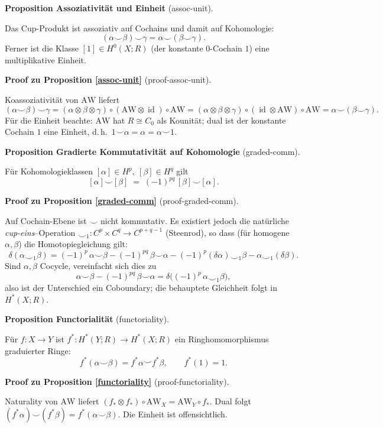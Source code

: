 \documentclass[10pt, letterpaper]{article}
\newcommand{\id}{\operatorname{id}}
\newcommand{\CustomHeading}[3]{%
  \par\medskip\noindent%
  \textbf{#1 #2} \textnormal{(#3)}.\enskip%
}
\newenvironment{PROP}[2]{\begin{unitbox}\CustomHeading{Proposition}{#1}{#2}}{\end{unitbox}}
\newenvironment{PROOF}[2]{\begin{unitbox}\CustomHeading{Proof}{#1}{#2}}{\end{unitbox}}
\begin{document}
\begin{PROP}{Assoziativität und Einheit}{assoc-unit}
Das Cup-Produkt ist assoziativ auf Cochains und damit auf Kohomologie:
\[
(\alpha\smile\beta)\smile\gamma=\alpha\smile(\beta\smile\gamma).
\]
Ferner ist die Klasse $[1]\in H^0(X;R)$ (der konstante $0$-Cochain $1$) eine multiplikative Einheit.
\end{PROP}

\begin{PROOF}{zu Proposition \ref{assoc-unit}}{proof-assoc-unit}
Koassoziativität von $\mathrm{AW}$ liefert
\[
(\alpha\smile\beta)\smile\gamma
=(\alpha\otimes\beta\otimes\gamma)\circ(\mathrm{AW}\otimes\id)\circ\mathrm{AW}
=(\alpha\otimes\beta\otimes\gamma)\circ(\id\otimes\mathrm{AW})\circ\mathrm{AW}
=\alpha\smile(\beta\smile\gamma).
\]
Für die Einheit beachte: $\mathrm{AW}$ hat $R\cong C_0$ als Kounität; dual ist der konstante Cochain $1$ eine Einheit, d.\,h.\ $1\smile\alpha=\alpha=\alpha\smile 1$.
\end{PROOF}

\begin{PROP}{Gradierte Kommutativität auf Kohomologie}{graded-comm}
Für Kohomologieklassen $[\alpha]\in H^p,\ [\beta]\in H^q$ gilt
\[
[\alpha]\smile[\beta]\;=\;(-1)^{pq}\,[\beta]\smile[\alpha].
\]
\end{PROP}

\begin{PROOF}{zu Proposition \ref{graded-comm}}{proof-graded-comm}
Auf Cochain-Ebene ist $\smile$ nicht kommutativ. 
Es existiert jedoch die natürliche \emph{cup-eins}–Operation $\smallsmile_1:C^p\times C^q\to C^{p+q-1}$ (Steenrod), 
so dass (für homogene $\alpha,\beta$) die Homotopiegleichung gilt:
\[
\delta(\alpha\smallsmile_1\beta)
=(-1)^p\,\alpha\smile\beta - (-1)^{pq}\,\beta\smile\alpha
-(-1)^p(\delta\alpha)\smallsmile_1\beta - \alpha\smallsmile_1(\delta\beta).
\]
Sind $\alpha,\beta$ Cocycle, vereinfacht sich dies zu
\[
\alpha\smile\beta - (-1)^{pq}\,\beta\smile\alpha
=\delta\big((-1)^p\,\alpha\smallsmile_1\beta\big),
\]
also ist der Unterschied ein Coboundary; die behauptete Gleichheit folgt in $H^\ast(X;R)$.
\end{PROOF}

\begin{PROP}{Functorialität}{functoriality}
Für $f:X\to Y$ ist $f^*:H^\ast(Y;R)\to H^\ast(X;R)$ ein Ringhomomorphismus graduierter Ringe:
\[
f^*(\alpha\smile\beta)=f^*\alpha\smile f^*\beta,\qquad f^*(1)=1.
\]
\end{PROP}

\begin{PROOF}{zu Proposition \ref{functoriality}}{proof-functoriality}
Naturality von $\mathrm{AW}$ liefert $(f_*\otimes f_*)\circ \mathrm{AW}_X=\mathrm{AW}_Y\circ f_*$.
Dual folgt $(f^*\alpha)\smile(f^*\beta)=f^*(\alpha\smile\beta)$. Die Einheit ist offensichtlich.
\end{PROOF}
\end{document}
